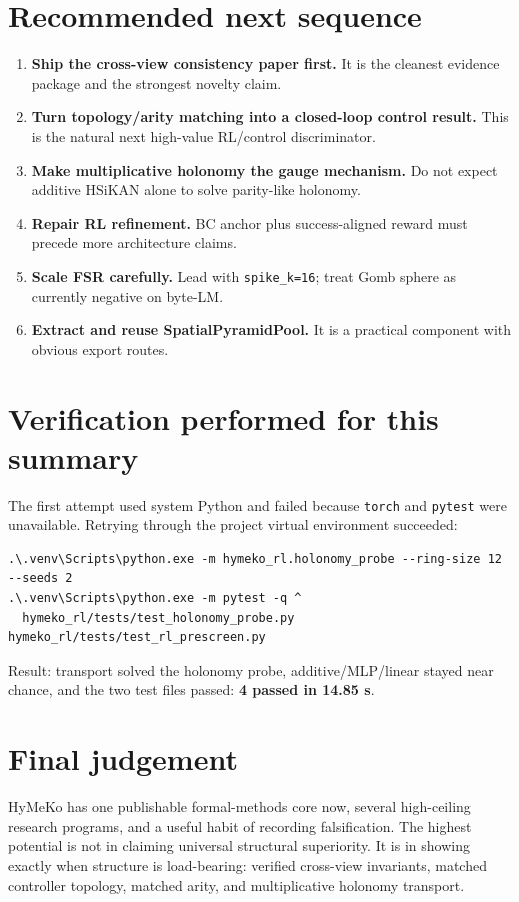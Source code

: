 \documentclass[11pt]{article}
\newcommand{\pathref}[1]{\nolinkurl{#1}}
\begin{document}
\section{Recommended next sequence}

\begin{enumerate}
  \item \textbf{Ship the cross-view consistency paper first.} It is the cleanest
  evidence package and the strongest novelty claim.
  \item \textbf{Turn topology/arity matching into a closed-loop control result.}
  This is the natural next high-value RL/control discriminator.
  \item \textbf{Make multiplicative holonomy the gauge mechanism.} Do not expect
  additive HSiKAN alone to solve parity-like holonomy.
  \item \textbf{Repair RL refinement.} BC anchor plus success-aligned reward must
  precede more architecture claims.
  \item \textbf{Scale FSR carefully.} Lead with \pathref{spike_k=16}; treat Gomb
  sphere as currently negative on byte-LM.
  \item \textbf{Extract and reuse SpatialPyramidPool.} It is a practical component
  with obvious export routes.
\end{enumerate}

\section{Verification performed for this summary}

The first attempt used system Python and failed because \pathref{torch} and
\pathref{pytest} were unavailable. Retrying through the project virtual
environment succeeded:
\begin{verbatim}
.\.venv\Scripts\python.exe -m hymeko_rl.holonomy_probe --ring-size 12 --seeds 2
.\.venv\Scripts\python.exe -m pytest -q ^
  hymeko_rl/tests/test_holonomy_probe.py hymeko_rl/tests/test_rl_prescreen.py
\end{verbatim}

Result: transport solved the holonomy probe, additive/MLP/linear stayed near
chance, and the two test files passed: \textbf{4 passed in 14.85 s}.

\section{Final judgement}

HyMeKo has one publishable formal-methods core now, several high-ceiling research
programs, and a useful habit of recording falsification. The highest potential is
not in claiming universal structural superiority. It is in showing exactly when
structure is load-bearing: verified cross-view invariants, matched controller
topology, matched arity, and multiplicative holonomy transport.
\end{document}
